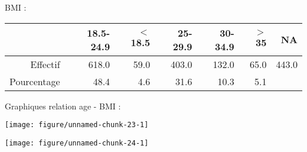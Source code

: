 \documentclass[11pt,a4paper]{article}\usepackage[]{graphicx}\usepackage[]{color}
\makeatletter
\def\maxwidth{ %
  \ifdim\Gin@nat@width>\linewidth
    \linewidth
  \else
    \Gin@nat@width
  \fi
}
\newenvironment{knitrout}{}{} %
\makeatother
\begin{document}
BMI :

\begin{table}[H]
\centering
\begin{tabular}{rrrrrrr}
  \hline
 & 18.5-24.9 & $<$18.5 & 25-29.9 & 30-34.9 & $>$35 & NA \\ 
  \hline
Effectif & 618.0 & 59.0 & 403.0 & 132.0 & 65.0 & 443.0 \\ 
  Pourcentage & 48.4 & 4.6 & 31.6 & 10.3 & 5.1 &  \\ 
   \hline
\end{tabular}
\end{table}


% 

Graphiques relation age - BMI :

\begin{knitrout}
\color{fgcolor}
\texttt{[image: figure/unnamed-chunk-23-1]} 

\end{knitrout}

\begin{knitrout}
\color{fgcolor}
\texttt{[image: figure/unnamed-chunk-24-1]} 

\end{knitrout}
\end{document}
